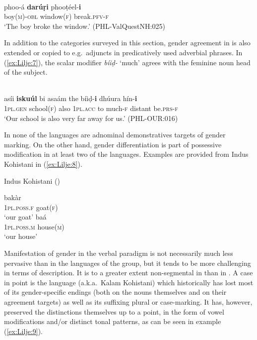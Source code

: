 \documentclass[output=collectionpaper]{langsci/langscibook}
\begin{document}
\ea
\label{ex:Lilje:6}
\\
\gll phoo-á \textbf{darúṛi} phooṭéel-\textbf{i}\\
boy(\textsc{m})\textsc{{}-obl} window(\textsc{f}) break.\textsc{pfv-}\textsc{f}     \\
\glt `The boy broke the window.' (PHL-ValQuestNH:025)
\z

In addition to the categories surveyed in this section, gender agreement in  is also extended or copied to e.g.\ adjuncts in predicatively used adverbial phrases. In (\ref{ex:Lilje:7}), the scalar modifier \textit{bíiḍ-} `much' agrees with the feminine noun head of the subject.

\ea
\label{ex:Lilje:7}
\\
\gll asíi \textbf{iskuúl} bi asaám the bíiḍ-\textbf{i} dhúura hín-\textbf{i}\\
\textsc{1pl.gen} school(\textsc{f}) also \textsc{1pl.acc} to much-\textsc{f} distant be.\textsc{prs-}\textsc{f}\\
\glt `Our school is also very far away for us.' (PHL-OUR:016)\\
\z

In none of the  languages are adnominal demonstratives targets of gender marking. On the other hand, gender differentiation is part of possessive modification in at least two of the languages. Examples are provided from Indus Kohistani in (\ref{ex:Lilje:8}).

\ea
\label{ex:Lilje:8}
Indus Kohistani (\citealt[62, 82]{Lubberger2014})\\
\begin{xlist}
\ex
{} bakàr\\
\textsc{1pl.poss.f} goat(\textsc{f}) \\
\glt `our goat'
\ex
{} baá\\
\textsc{1pl.poss.m} house(\textsc{m})\\
\glt `our house'\\
\end{xlist}
\z

Manifestation of gender in the verbal paradigm is not necessarily much less pervasive than in the languages of the  group, but it tends to be more challenging in terms of description. It is to a greater extent non-segmental in  than in . A case in point is the  language  (a.k.a.\ Kalam Kohistani) which historically has lost most of its gender-specific endings (both on the nouns themselves and on their agreement targets) as well as its suffixing plural or case-marking. It has, however, preserved the distinctions themselves up to a point, in the form of vowel modifications and/or distinct tonal patterns, as can be seen in example (\ref{ex:Lilje:9}).
\end{document}
